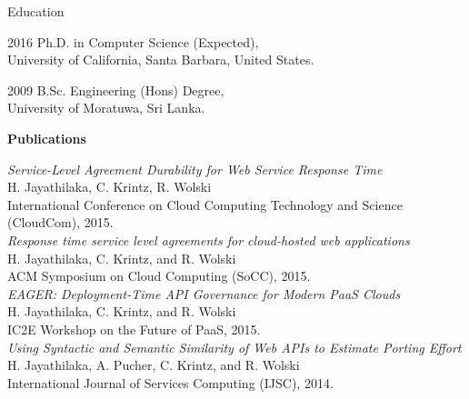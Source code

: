 \begin{vitae}

\begin{vitaesection}{Education}
\vspace{-0.1cm}
\item [2016]	Ph.D. in Computer Science (Expected), \\ University of California, Santa Barbara, United States.
\item [2009]	B.Sc. Engineering (Hons) Degree, \\ University of Moratuwa, Sri Lanka.
\end{vitaesection}

\textbf{Publications}



\textit{Service-Level Agreement Durability for Web Service Response Time} \\
H. Jayathilaka, C. Krintz, R. Wolski \\
International Conference on Cloud Computing Technology and Science (CloudCom), 2015. \\

\textit{Response time service level agreements for cloud-hosted web applications} \\
H. Jayathilaka, C. Krintz, and R. Wolski \\
ACM Symposium on Cloud Computing (SoCC), 2015. \\

\textit{EAGER: Deployment-Time API Governance for Modern PaaS Clouds} \\
H. Jayathilaka, C. Krintz, and R. Wolski \\
IC2E Workshop on the Future of PaaS, 2015. \\

\textit{Using Syntactic and Semantic Similarity of Web APIs to Estimate Porting Effort} \\
H. Jayathilaka, A. Pucher, C. Krintz, and R. Wolski \\
International Journal of Services Computing (IJSC), 2014. \\


\end{vitae}

